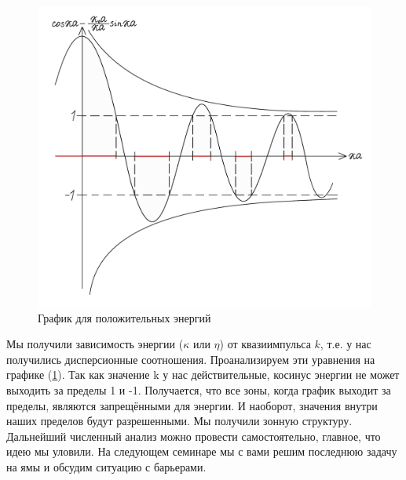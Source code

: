 \begin{figure}[h!]
\centering
\includegraphics[scale=0.23]{class 4/images/pos energy delta.png}
\caption{График для положительных энергий}
\label{fig 4.6}
\end{figure}

Мы получили зависимость энергии ($\kappa$ или $\eta$) от квазиимпульса $k$, т.е. у нас получились дисперсионные соотношения. Проанализируем эти уравнения на графике (\ref{fig 4.6}). Так как значение k у нас действительные, косинус энергии не может выходить за пределы 1 и -1. Получается, что все зоны, когда график выходит за пределы, являются запрещёнными для энергии. И наоборот, значения внутри наших пределов будут разрешенными. Мы получили зонную структуру. Дальнейший численный анализ можно провести самостоятельно, главное, что идею мы уловили. 
На следующем семинаре мы с вами решим последнюю задачу на ямы и обсудим ситуацию с барьерами.